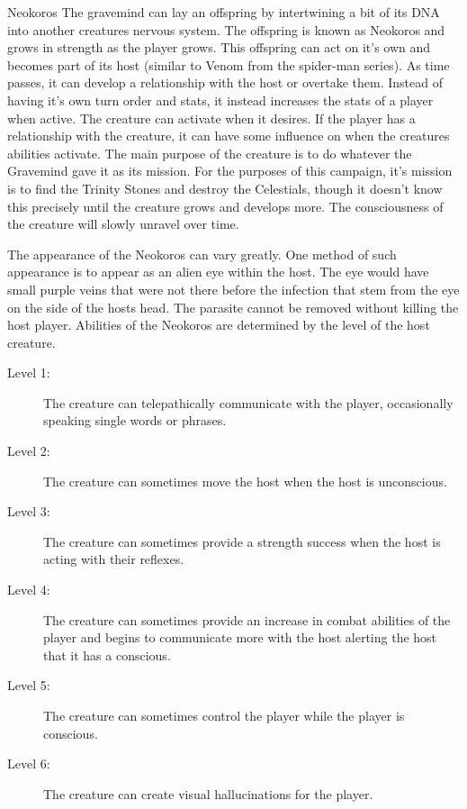 \begin{commentbox}{Neokoros}
	The gravemind can lay an offspring by intertwining a bit of its DNA into another creatures nervous system. The offspring is known as Neokoros and grows in strength as the player grows. This offspring can act on it's own and becomes part of its host (similar to Venom from the spider-man series). As time passes, it can develop a relationship with the host or overtake them. Instead of having it's own turn order and stats, it instead increases the stats of a player when active. The creature can activate when it desires. If the player has a relationship with the creature, it can have some influence on when the creatures abilities activate. The main purpose of the creature is to do whatever the Gravemind gave it as its mission. For the purposes of this campaign, it's mission is to find the Trinity Stones and destroy the Celestials, though it doesn't know this precisely until the creature grows and develops more. The consciousness of the creature will slowly unravel over time.
	
	The appearance of the Neokoros can vary greatly. One method of such appearance is to appear as an alien eye within the host. The eye would have small purple veins that were not there before the infection that stem from the eye on the side of the hosts head. The parasite cannot be removed without killing the host player. Abilities of the Neokoros are determined by the level of the host creature.
	
	\begin{description}
		\item[Level 1:] The creature can telepathically communicate with the player, occasionally speaking single words or phrases.
		\item[Level 2:] The creature can sometimes move the host when the host is unconscious.
		\item[Level 3:] The creature can sometimes provide a strength success when the host is acting with their reflexes. 
		\item[Level 4:] The creature can sometimes provide an increase in combat abilities of the player and begins to communicate more with the host alerting the host that it has a conscious.
		\item[Level 5:] The creature can sometimes control the player while the player is conscious.
		\item[Level 6:] The creature can create visual hallucinations for the player.
 	\end{description}
\end{commentbox}
